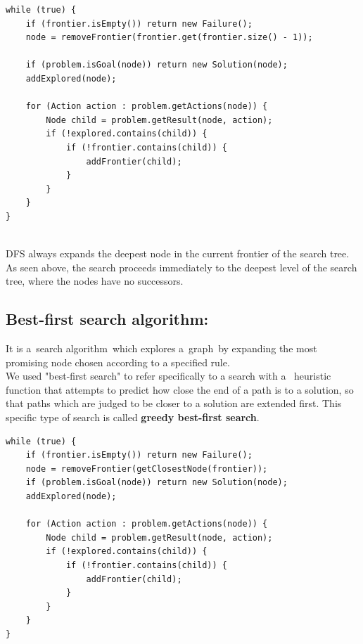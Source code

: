\documentclass[a4paper]{article}
\begin{document}
\begin{lstlisting}
while (true) {
    if (frontier.isEmpty()) return new Failure();
    node = removeFrontier(frontier.get(frontier.size() - 1));
    
    if (problem.isGoal(node)) return new Solution(node);
    addExplored(node);

    for (Action action : problem.getActions(node)) {
        Node child = problem.getResult(node, action);
        if (!explored.contains(child)) {
            if (!frontier.contains(child)) {
                addFrontier(child);
            }
        }
    }
}
\end{lstlisting}

\noindent \\
DFS always expands the deepest node in the current frontier of the search tree. As seen above, the search proceeds immediately to the deepest level of the search tree, where the nodes have no successors.


\subsection{Best-first search algorithm:}

It is a search algorithm which explores a graph by expanding the most promising node chosen according to a specified rule.\\

\noindent We used "best-first search" to refer specifically to a search with a  heuristic function that attempts to predict how close the end of a path is to a solution, so that paths which are judged to be closer to a solution are extended first. This specific type of search is called \textbf{greedy best-first search}.

\begin{lstlisting}
while (true) {
    if (frontier.isEmpty()) return new Failure();
    node = removeFrontier(getClosestNode(frontier));
    if (problem.isGoal(node)) return new Solution(node);
    addExplored(node);

    for (Action action : problem.getActions(node)) {
        Node child = problem.getResult(node, action);
        if (!explored.contains(child)) {
            if (!frontier.contains(child)) {
                addFrontier(child);
            }
        }
    }
}
\end{lstlisting}
\end{document}
